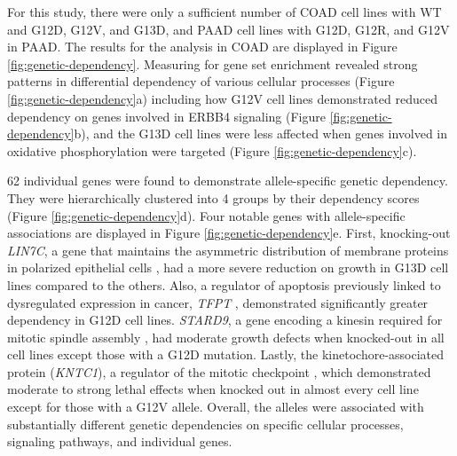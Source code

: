 For this study, there were only a sufficient number of COAD cell lines with WT \KRAS{} and \KRAS{} G12D, G12V, and G13D, and PAAD cell lines with G12D, G12R, and G12V in PAAD.
The results for the analysis in COAD are displayed in Figure \ref{fig:genetic-dependency}.
Measuring for gene set enrichment revealed strong patterns in differential dependency of various cellular processes (Figure \ref{fig:genetic-dependency}a) including how \KRAS{} G12V cell lines demonstrated reduced dependency on genes involved in ERBB4 signaling (Figure \ref{fig:genetic-dependency}b), and the \KRAS{} G13D cell lines were less affected when genes involved in oxidative phosphorylation were targeted (Figure \ref{fig:genetic-dependency}c).

62 individual genes were found to demonstrate \KRAS{} allele-specific genetic dependency.
They were hierarchically clustered into 4 groups by their dependency scores (Figure \ref{fig:genetic-dependency}d).
Four notable genes with allele-specific associations are displayed in Figure \ref{fig:genetic-dependency}e.
First, knocking-out \emph{LIN7C}, a gene that maintains the asymmetric distribution of membrane proteins in polarized epithelial cells \cite{Monastyrskaya2013MiR-199a-5pSyndrome}, had a more severe reduction on growth in \KRAS{ } G13D cell lines compared to the others.
Also, a regulator of apoptosis previously linked to dysregulated expression in cancer, \emph{TFPT} \cite{Franchini2006ApoptosisInfluenced, Rapaport2010DeterminingCancer, Huttlin2015, Reid2019Genome-wideRisk}, demonstrated significantly greater dependency in G12D cell lines.
\emph{STARD9}, a gene encoding a kinesin required for mitotic spindle assembly \cite{Torres2011TheAssembly}, had moderate growth defects when knocked-out in all cell lines except those with a \KRAS{} G12D mutation.
Lastly, the kinetochore-associated protein (\emph{KNTC1}), a regulator of the mitotic checkpoint \cite{Chan2000HumanKinetochores., Scaerou2001TheKinetochore., Kops2005ZW10Kinetochore.}, which demonstrated moderate to strong lethal effects when knocked out in almost every cell line except for those with a \KRAS{} G12V allele.
Overall, the \KRAS{} alleles were associated with substantially different genetic dependencies on specific cellular processes, signaling pathways, and individual genes.



